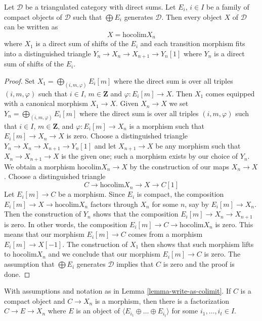 \begin{lemma}
\label{lemma-write-as-colimit}
Let $\mathcal{D}$ be a triangulated category with direct sums.
Let $E_i$, $i \in I$ be a family of compact objects of $\mathcal{D}$
such that $\bigoplus E_i$ generates $\mathcal{D}$.
Then every object $X$ of $\mathcal{D}$ can be written as
$$
X = \text{hocolim} X_n
$$
where $X_1$ is a direct sum of shifts of the $E_i$ and each transition
morphism fits into a distinguished triangle
$Y_n \to X_n \to X_{n + 1} \to Y_n[1]$
where $Y_n$ is a direct sum of shifts of the $E_i$.
\end{lemma}

\begin{proof}
Set $X_1 = \bigoplus_{(i, m, \varphi)} E_i[m]$ where the direct sum is over
all triples $(i, m, \varphi)$ such that $i \in I$, $m \in \mathbf{Z}$
and $\varphi : E_i[m] \to X$. Then $X_1$ comes equipped with a canonical
morphism $X_1 \to X$. Given $X_n \to X$ we set
$Y_n = \bigoplus_{(i, m, \varphi)} E_i[m]$ where the direct sum is over
all triples $(i, m, \varphi)$ such that $i \in I$, $m \in \mathbf{Z}$, and
$\varphi : E_i[m] \to X_n$ is a morphism such that $E_i[m] \to X_n \to X$
is zero. Choose a distinguished triangle
$Y_n \to X_n \to X_{n + 1} \to Y_n[1]$
and let $X_{n + 1} \to X$ be any morphism such that $X_n \to X_{n + 1} \to X$
is the given one; such a morphism exists by our choice of $Y_n$.
We obtain a morphism $\text{hocolim} X_n \to X$ by the construction
of our maps $X_n \to X$. Choose a distinguished triangle
$$
C \to \text{hocolim} X_n \to X \to C[1]
$$
Let $E_i[m] \to C$ be a morphism. Since $E_i$ is compact, the
composition $E_i[m] \to X \to \text{hocolim} X_n$ factors through
$X_n$ for some $n$, say by $E_i[m] \to X_n$. Then the
construction of $Y_n$ shows that the composition
$E_i[m] \to X_n \to X_{n + 1}$ is zero. In other words, the composition
$E_i[m] \to C \to \text{hocolim} X_n$ is zero. This means that our
morphism $E_i[m] \to C$ comes from a morphism $E_i[m] \to X[-1]$.
The construction of $X_1$ then shows that such morphism lifts to
$\text{hocolim} X_n$ and we conclude that our morphism $E_i[m] \to C$
is zero. The assumption that $\bigoplus E_i$ generates $\mathcal{D}$
implies that $C$ is zero and the proof is done.
\end{proof}

\begin{lemma}
\label{lemma-factor-through}
With assumptions and notation as in Lemma \ref{lemma-write-as-colimit}.
If $C$ is a compact object and $C \to X_n$ is a morphism, then
there is a factorization $C \to E \to X_n$ where
$E$ is an object of $\langle E_{i_1} \oplus \ldots \oplus E_{i_t} \rangle$
for some $i_1, \ldots, i_t \in I$.
\end{lemma}

